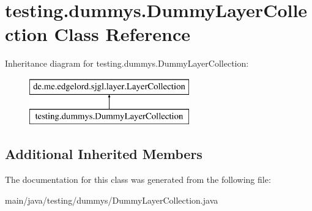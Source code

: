 \hypertarget{classtesting_1_1dummys_1_1_dummy_layer_collection}{}\section{testing.\+dummys.\+Dummy\+Layer\+Collection Class Reference}
\label{classtesting_1_1dummys_1_1_dummy_layer_collection}
Inheritance diagram for testing.\+dummys.\+Dummy\+Layer\+Collection\+:\begin{figure}[H]
\begin{center}
\leavevmode
\includegraphics[height=2.000000cm]{classtesting_1_1dummys_1_1_dummy_layer_collection}
\end{center}
\end{figure}
\subsection*{Additional Inherited Members}


The documentation for this class was generated from the following file\+:\begin{DoxyCompactItemize}
\item 
main/java/testing/dummys/Dummy\+Layer\+Collection.\+java\end{DoxyCompactItemize}
